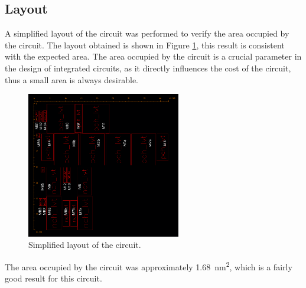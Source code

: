 \subsection{Layout}

A simplified layout of the circuit was performed to verify the area occupied by the circuit. The layout obtained is shown in Figure \ref{fig:layout}, this result is consistent with the expected area. The area occupied by the circuit is a crucial parameter in the design of integrated circuits, as it directly influences the cost of the circuit, thus a small area is always desirable.

\begin{figure}[H]
    \centering
    \includegraphics[width=0.6\textwidth]{Images/layout.png}
    \caption{Simplified layout of the circuit.}
    \label{fig:layout}
\end{figure}

The area occupied by the circuit was approximately \SI{1.68}{\nano\meter\squared}, which is a fairly good result for this circuit.